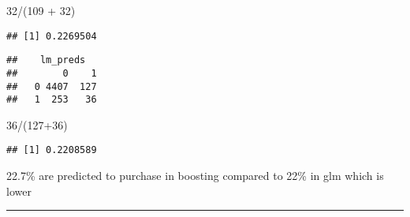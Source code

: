 \documentclass[
]{article}
\newenvironment{Shaded}{\begin{snugshade}}{\end{snugshade}}
\newcommand{\AttributeTok}[1]{\textcolor[rgb]{0.77,0.63,0.00}{#1}}
\newcommand{\CommentTok}[1]{\textcolor[rgb]{0.56,0.35,0.01}{\textit{#1}}}
\newcommand{\DecValTok}[1]{\textcolor[rgb]{0.00,0.00,0.81}{#1}}
\newcommand{\FloatTok}[1]{\textcolor[rgb]{0.00,0.00,0.81}{#1}}
\newcommand{\FunctionTok}[1]{\textcolor[rgb]{0.00,0.00,0.00}{#1}}
\newcommand{\NormalTok}[1]{#1}
\newcommand{\OtherTok}[1]{\textcolor[rgb]{0.56,0.35,0.01}{#1}}
\newcommand{\SpecialCharTok}[1]{\textcolor[rgb]{0.00,0.00,0.00}{#1}}
\newcommand{\StringTok}[1]{\textcolor[rgb]{0.31,0.60,0.02}{#1}}
\begin{document}
\begin{Shaded}
\begin{Highlighting}[]
\DecValTok{32}\SpecialCharTok{/}\NormalTok{(}\DecValTok{109} \SpecialCharTok{+} \DecValTok{32}\NormalTok{)}
\end{Highlighting}
\end{Shaded}

\begin{verbatim}
## [1] 0.2269504
\end{verbatim}

\begin{Shaded}
\end{Shaded}

\begin{verbatim}
##    lm_preds
##        0    1
##   0 4407  127
##   1  253   36
\end{verbatim}

\begin{Shaded}
\begin{Highlighting}[]
\DecValTok{36}\SpecialCharTok{/}\NormalTok{(}\DecValTok{127}\SpecialCharTok{+}\DecValTok{36}\NormalTok{)}
\end{Highlighting}
\end{Shaded}

\begin{verbatim}
## [1] 0.2208589
\end{verbatim}

22.7\% are predicted to purchase in boosting compared to 22\% in glm
which is lower

\begin{center}\rule{0.5\linewidth}{0.5pt}\end{center}
\end{document}
